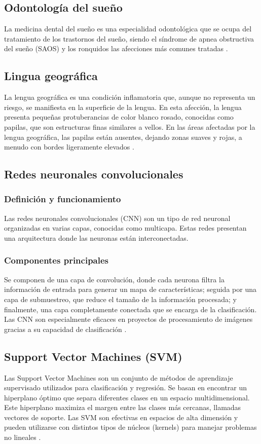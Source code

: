 \subsection{Odontología del sueño}
La medicina dental del sueño es una especialidad odontológica que se ocupa del tratamiento de los trastornos del sueño, siendo el síndrome de apnea obstructiva del sueño (SAOS) y los ronquidos las afecciones más comunes tratadas \parencite{gutierrez2021bruxismorino}.

\subsection{Lingua geográfica}
La lengua geográfica es una condición inflamatoria que, aunque no representa un riesgo, se manifiesta en la superficie de la lengua. En esta afección, la lengua presenta pequeñas protuberancias de color blanco rosado, conocidas como papilas, que son estructuras finas similares a vellos. En las áreas afectadas por la lengua geográfica, las papilas están ausentes, dejando zonas suaves y rojas, a menudo con bordes ligeramente elevados \parencite{mayoclinic2024lenguageografica}.

\subsection{Redes neuronales convolucionales}
\subsubsection{Definición y funcionamiento}
Las redes neuronales convolucionales (CNN) son un tipo de red neuronal organizadas en varias capas, conocidas como multicapa. Estas redes presentan una arquitectura donde las neuronas están interconectadas. 

\subsubsection{Componentes principales}
Se componen de una capa de convolución, donde cada neurona filtra la información de entrada para generar un mapa de características; seguida por una capa de submuestreo, que reduce el tamaño de la información procesada; y finalmente, una capa completamente conectada que se encarga de la clasificación. Las CNN son especialmente eficaces en proyectos de procesamiento de imágenes gracias a su capacidad de clasificación \parencite{lopezpacheco2021redesconv}.

\subsection{Support Vector Machines (SVM)}
Las Support Vector Machines son un conjunto de métodos de aprendizaje supervisado utilizados para clasificación y regresión. Se basan en encontrar un hiperplano óptimo que separa diferentes clases en un espacio multidimensional. Este hiperplano maximiza el margen entre las clases más cercanas, llamadas vectores de soporte. Las SVM son efectivas en espacios de alta dimensión y pueden utilizarse con distintos tipos de núcleos (kernels) para manejar problemas no lineales \parencite{cortes1995svm}.

